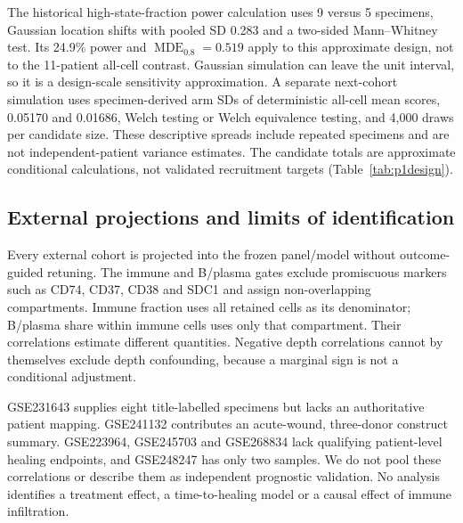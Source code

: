 \documentclass[10pt,a4paper]{article}
\begin{document}
The historical high-state-fraction power calculation uses 9 versus 5 specimens, Gaussian location shifts with pooled SD 0.283 and a two-sided Mann--Whitney test. Its 24.9\% power and $\operatorname{MDE}_{0.8}=0.519$ apply to this approximate design, not to the 11-patient all-cell contrast. Gaussian simulation can leave the unit interval, so it is a design-scale sensitivity approximation. A separate next-cohort simulation uses specimen-derived arm SDs of deterministic all-cell mean scores, 0.05170 and 0.01686, Welch testing or Welch equivalence testing, and 4,000 draws per candidate size. These descriptive spreads include repeated specimens and are not independent-patient variance estimates. The candidate totals are approximate conditional calculations, not validated recruitment targets (Table~\ref{tab:p1design}).

\subsection{External projections and limits of identification}
Every external cohort is projected into the frozen panel/model without outcome-guided retuning. The immune and B/plasma gates exclude promiscuous markers such as CD74, CD37, CD38 and SDC1 and assign non-overlapping compartments. Immune fraction uses all retained cells as its denominator; B/plasma share within immune cells uses only that compartment. Their correlations estimate different quantities. Negative depth correlations cannot by themselves exclude depth confounding, because a marginal sign is not a conditional adjustment.

GSE231643 supplies eight title-labelled specimens but lacks an authoritative patient mapping. GSE241132 contributes an acute-wound, three-donor construct summary. GSE223964, GSE245703 and GSE268834 lack qualifying patient-level healing endpoints, and GSE248247 has only two samples. We do not pool these correlations or describe them as independent prognostic validation. No analysis identifies a treatment effect, a time-to-healing model or a causal effect of immune infiltration.
\end{document}
